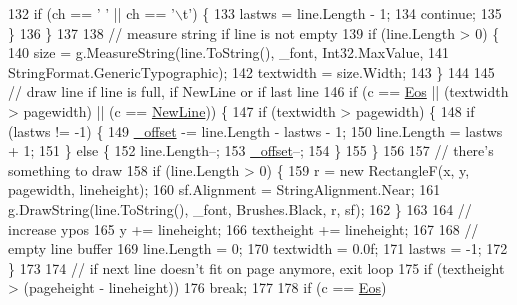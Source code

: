 \begin{DoxyCode}
132                 \textcolor{keywordflow}{if} (ch == \textcolor{charliteral}{' '} || ch == \textcolor{charliteral}{'\(\backslash\)t'}) \{
133                     lastws = line.Length - 1;
134                     \textcolor{keywordflow}{continue};
135                 \}
136             \}
137 
138             \textcolor{comment}{// measure string if line is not empty}
139             \textcolor{keywordflow}{if} (line.Length > 0) \{
140                 size = g.MeasureString(line.ToString(), \_font, Int32.MaxValue,
141                     StringFormat.GenericTypographic);
142                 textwidth = size.Width;
143             \}
144 
145             \textcolor{comment}{// draw line if line is full, if NewLine or if last line}
146             \textcolor{keywordflow}{if} (c == \hyperlink{class_multipad_print_document_adfd2fe48dc1a582ea58044a93dda2353}{Eos} || (textwidth > pagewidth) || (c == \hyperlink{class_multipad_print_document_a4a051275c8477606d5ef1d8f89cc54ca}{NewLine})) \{
147                 \textcolor{keywordflow}{if} (textwidth > pagewidth) \{
148                     \textcolor{keywordflow}{if} (lastws != -1) \{
149                         \hyperlink{class_multipad_print_document_a5a30e0a4319d60a90ea0ec1f861d4afa}{\_offset} -= line.Length - lastws - 1;
150                         line.Length = lastws + 1;
151                     \} \textcolor{keywordflow}{else} \{
152                         line.Length--;
153                         \hyperlink{class_multipad_print_document_a5a30e0a4319d60a90ea0ec1f861d4afa}{\_offset}--;
154                     \}
155                 \}
156 
157                 \textcolor{comment}{// there's something to draw}
158                 \textcolor{keywordflow}{if} (line.Length > 0) \{
159                     r = \textcolor{keyword}{new} RectangleF(x, y, pagewidth, lineheight);
160                     sf.Alignment = StringAlignment.Near;
161                     g.DrawString(line.ToString(), \_font, Brushes.Black, r, sf);
162                 \}
163 
164                 \textcolor{comment}{// increase ypos}
165                 y += lineheight;
166                 textheight += lineheight;
167 
168                 \textcolor{comment}{// empty line buffer}
169                 line.Length = 0;
170                 textwidth = 0.0f;
171                 lastws = -1;
172             \}
173 
174             \textcolor{comment}{// if next line doesn't fit on page anymore, exit loop}
175             \textcolor{keywordflow}{if} (textheight > (pageheight - lineheight))
176                 \textcolor{keywordflow}{break};
177 
178             \textcolor{keywordflow}{if} (c == \hyperlink{class_multipad_print_document_adfd2fe48dc1a582ea58044a93dda2353}{Eos})

\end{DoxyCode}
